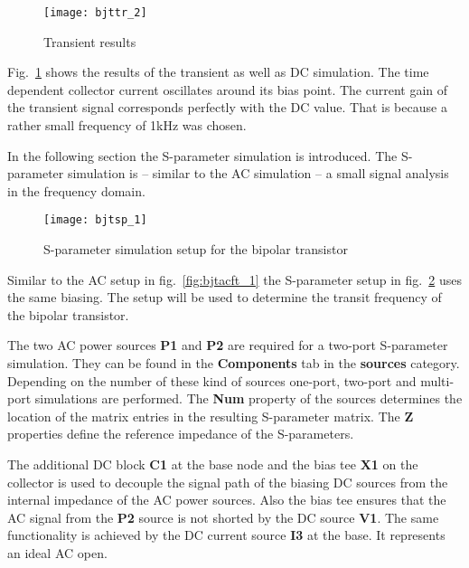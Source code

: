 \begin{figure}[ht]
  \centering
  \texttt{[image: bjttr\_2]}
  \caption{Transient results}
  \label{fig:ibjttr_2}
\end{figure}
\FloatBarrier

Fig.~\ref{fig:ibjttr_2} shows the results of the transient as well as
DC simulation.  The time dependent collector current oscillates around
its bias point.  The current gain of the transient signal corresponds
perfectly with the DC value.  That is because a rather small frequency
of 1kHz was chosen.


In the following section the S-parameter simulation is introduced.
The S-parameter simulation is -- similar to the AC simulation -- a
small signal analysis in the frequency domain.

\begin{figure}[ht]
  \centering
  \texttt{[image: bjtsp\_1]}
  \caption{S-parameter simulation setup for the bipolar transistor}
  \label{fig:bjtsp_1}
\end{figure}
\FloatBarrier

Similar to the AC setup in fig.~\ref{fig:bjtacft_1} the S-parameter
setup in fig.~\ref{fig:bjtsp_1} uses the same biasing.  The setup will
be used to determine the transit frequency of the bipolar transistor.

\medskip

The two AC power sources \textbf{P1} and \textbf{P2} are required for
a two-port S-parameter simulation.  They can be found in the
\textbf{Components} tab in the \textbf{sources} category.  Depending
on the number of these kind of sources one-port, two-port and
multi-port simulations are performed.  The \textbf{Num} property of
the sources determines the location of the matrix entries in the
resulting S-parameter matrix.  The \textbf{Z} properties define the
reference impedance of the S-parameters.

\medskip

The additional DC block \textbf{C1} at the base node and the bias tee
\textbf{X1} on the collector is used to decouple the signal path of
the biasing DC sources from the internal impedance of the AC power
sources.  Also the bias tee ensures that the AC signal from the
\textbf{P2} source is not shorted by the DC source \textbf{V1}.  The
same functionality is achieved by the DC current source \textbf{I3} at
the base.  It represents an ideal AC open.

